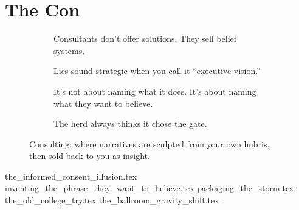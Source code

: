 \section{The Con}
\vfill

\begin{figure}[H]
  \centering

  \begin{subfigure}[t]{0.45\textwidth}
  \centering
  \caption*{Consultants don’t offer solutions. They sell belief systems.}
  \end{subfigure}
  \hfill
  \begin{subfigure}[t]{0.45\textwidth}
  \centering
  \caption*{Lies sound strategic when you call it ``executive vision.''}
  \end{subfigure}

  \vspace{1em}

  \begin{subfigure}[t]{0.45\textwidth}
  \centering
  \caption*{It’s not about naming what it does. It’s about naming what they want to believe.}
  \end{subfigure}
  \hfill
  \begin{subfigure}[t]{0.45\textwidth}
  \centering
  \caption*{The herd always thinks it chose the gate.}
  \end{subfigure}

  \caption*{Consulting: where narratives are sculpted from your own hubris, then sold back 
  to you as insight.}
\end{figure}

{the_informed_consent_illusion.tex}
{inventing_the_phrase_they_want_to_believe.tex}
{packaging_the_storm.tex}
{the_old_college_try.tex}
{the_ballroom_gravity_shift.tex}